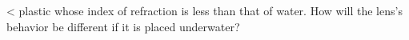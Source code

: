 <%
plastic whose index of refraction is less than that of
water. How will the lens's behavior be different if it
is placed underwater?
